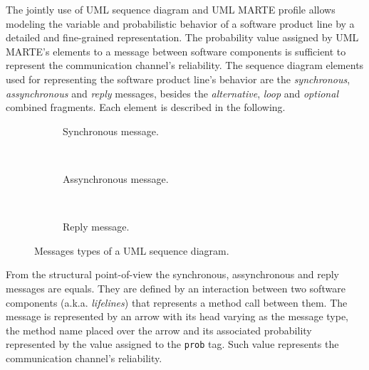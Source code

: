 The jointly use of UML sequence diagram and UML MARTE profile allows modeling
the variable and probabilistic behavior of a software product line by a
detailed and fine-grained representation. 
The probability value assigned by UML MARTE's elements to a
message between software components is sufficient to represent the
communication channel's reliability. The sequence diagram elements used
for representing the software product line's behavior are the \emph{synchronous},
\emph{assynchronous} and \emph{reply} messages, besides the \emph{alternative},
\emph{loop} and \emph{optional} combined fragments. Each element is described in the following.

\begin{figure}[h!]
\begin{subfigure}[c]{0.3\textwidth}

\caption{Synchronous message.}
\label{fig:sync_SD}
\end{subfigure}
~
\begin{subfigure}[c]{0.3\textwidth}

\caption{Assynchronous message.}
\label{fig:assync_SD}
\end{subfigure}
~
\begin{subfigure}[c]{0.3\textwidth}

\caption{Reply message.}
\label{fig:reply_SD}
\end{subfigure}

\caption{Messages types of a UML sequence diagram.}
\label{fig:messages_SD}
\end{figure}


From the structural point-of-view the synchronous, assynchronous and reply
messages are equals. They are defined by an interaction between two software
components (a.k.a. \emph{lifelines}) that represents a method
call between them. The message is represented by an arrow with its head varying
as the message type, the method name placed over the arrow and its associated
probability represented by the value assigned to the \texttt{prob} tag. Such value
represents the communication channel's reliability.

